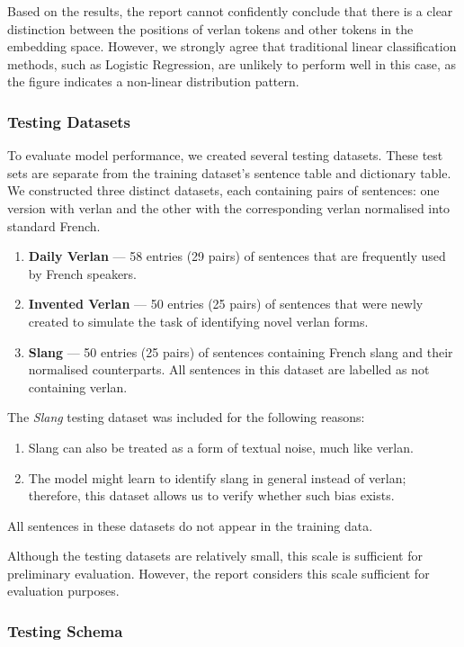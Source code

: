 \documentclass[12pt]{article}
\begin{document}
Based on the results, the report cannot confidently conclude that there is a clear distinction between the positions of verlan tokens and other tokens in the embedding space. 
However, we strongly agree that traditional linear classification methods, such as Logistic Regression, are unlikely to perform well in this case, as the figure indicates a non-linear distribution pattern.

\subsubsection{Testing Datasets}
To evaluate model performance, we created several testing datasets. 
These test sets are separate from the training dataset's sentence table and dictionary table. 
We constructed three distinct datasets, each containing pairs of sentences: one version with verlan and the other with the corresponding verlan normalised into standard French.

\begin{enumerate}
\item \textbf{Daily Verlan} --- 58 entries (29 pairs) of sentences that are frequently used by French speakers.
  \item \textbf{Invented Verlan} --- 50 entries (25 pairs) of sentences that were newly created to simulate the task of identifying novel verlan forms.
  \item \textbf{Slang} --- 50 entries (25 pairs) of sentences containing French slang and their normalised counterparts. All sentences in this dataset are labelled as not containing verlan.
\end{enumerate}

The \textit{Slang} testing dataset was included for the following reasons:
\begin{enumerate}
  \item Slang can also be treated as a form of textual noise, much like verlan.
  \item The model might learn to identify slang in general instead of verlan; therefore, this dataset allows us to verify whether such bias exists.
\end{enumerate}

All sentences in these datasets do not appear in the training data.
 
Although the testing datasets are relatively small, this scale is sufficient for preliminary evaluation.
However, the report considers this scale sufficient for evaluation purposes.

\subsubsection{Testing Schema}
\end{document}
